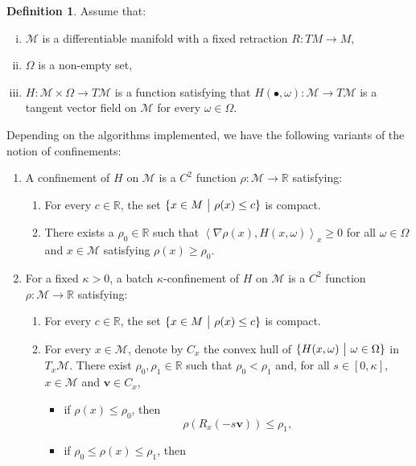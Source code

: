 \documentclass{amsart}
\newcommand{\R}{\mathbb{R}}
\newcommand{\M}{\mathcal{M}}
\theoremstyle{plain}
\theoremstyle{definition}
\newtheorem{definition}[theorem]{Definition}
\theoremstyle{remark}
\numberwithin{theorem}{section}
\numberwithin{equation}{section}
\begin{document}
\begin{definition}\cite[Definition 2.5]{XYW-2024} \cite[Definition 2.5]{YXW-2024}\label{def-confinement}
Assume that:
\begin{enumerate}[(i)]
	\item $\M$ is a differentiable manifold with a fixed retraction $R:TM\rightarrow M$,
	\item $\Omega$ is a non-empty set,
	\item $H:\M\times \Omega \rightarrow T\M$ is a function satisfying that $H(\bullet, \omega): \M\rightarrow T\M$ is a tangent vector field on $\M$ for every $\omega \in \Omega$.
\end{enumerate}
Depending on the algorithms implemented, we have the following variants of the notion of confinements:
\begin{enumerate}[1.]
	\item A confinement of $H$ on $\M$ is a $C^2$ function $\rho: \M \rightarrow \R$ satisfying:
\begin{enumerate}
	\item For every $c\in \R$, the set $\{x \in M~\big{|}~ \rho(x)\leq c\}$ is compact.
	\item There exists a $\rho_0\in \R$ such that $\left\langle \nabla \rho (x), H(x,\omega) \right\rangle_x \geq 0$ for all $\omega \in \Omega$ and $x \in \M$ satisfying $\rho(x)\geq \rho_0$.
\end{enumerate}
  \item For a fixed $\kappa>0$, a batch $\kappa$-confinement of $H$ on $\M$ is a $C^2$ function $\rho: \M \rightarrow \R$ satisfying:
\begin{enumerate}
	\item For every $c\in \R$, the set $\{x \in M~\big{|}~ \rho(x)\leq c\}$ is compact.
	\item For every $x \in \M$, denote by $C_x$ the convex hull of $\{H(x,\omega)~\big{|}~\omega \in \Omega\}$ in $T_x \M$. There exist $\rho_0,\rho_1\in \R$ such that $\rho_0<\rho_1$ and, for all $s\in [0,\kappa]$, $x \in \M$ and $\mathbf{v} \in C_x$, 
	\begin{itemize}
		\item if $\rho(x)\leq \rho_0$, then
		\begin{equation}\label{eq-def-b-kappa-confinement-1}
    \rho\left(R_{x}\left(-s\mathbf{v}\right)\right)\leq \rho_1,
	  \end{equation}
	\item if $\rho_0\leq \rho(x)\leq \rho_1$, then
		\begin{equation}\label{eq-def-b-kappa-confinement-2}

\end{equation}
\end{itemize}
\end{enumerate}
\end{enumerate}
\end{definition}
\end{document}

